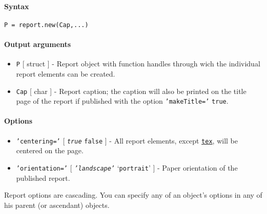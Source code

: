 


	\paragraph{Syntax}\label{syntax}

\begin{verbatim}
P = report.new(Cap,...)
\end{verbatim}

\paragraph{Output arguments}\label{output-arguments}

\begin{itemize}
\item
  \texttt{P} {[} struct {]} - Report object with function handles
  through wich the individual report elements can be created.
\item
  \texttt{Cap} {[} char {]} - Report caption; the caption will also be
  printed on the title page of the report if published with the option
  \texttt{'makeTitle='} \texttt{true}.
\end{itemize}

\paragraph{Options}\label{options}

\begin{itemize}
\item
  \texttt{'centering='} {[} \emph{\texttt{true}} \textbar{}
  \texttt{false} {]} - All report elements, except
  \href{report/tex}{\texttt{tex}}, will be centered on the page.
\item
  \texttt{'orientation='} {[} \emph{\texttt{'landscape'}} \textbar{}
  `\texttt{portrait}' {]} - Paper orientation of the published report.
\end{itemize}

Report options are cascading. You can specify any of an object's options
in any of his parent (or ascendant) objects.


